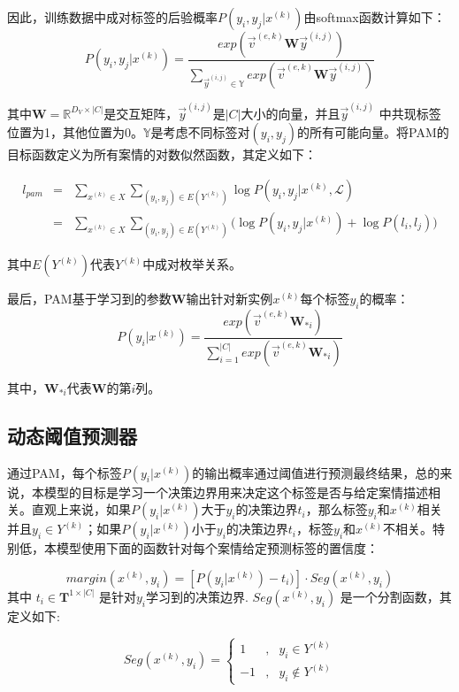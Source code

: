 因此，训练数据中成对标签的后验概率$P(y_i,y_j|x^{(k)})$由softmax函数计算如下：
\begin{displaymath}
P(y_i,y_j|x^{(k)})=\frac{exp(\vec{v}^{(e,k)}\textbf{W}\vec{y}^{(i,j)})}{\sum_{\vec{y}^{(i,j)}\in\mathbb{Y}}exp(\vec{v}^{(e,k)}\textbf{W}\vec{y}^{(i,j)})}
\end{displaymath}

其中$\textbf{W}=\mathbb{R}^{D_V\times |C|}$是交互矩阵，$\vec{y}^{(i,j)}$是$|C|$大小的向量，并且$\vec{y}^{(i,j)}$ 中共现标签位置为1，其他位置为0。$\mathbb{Y}$是考虑不同标签对$(y_i,y_j)$的所有可能向量。将PAM的目标函数定义为所有案情的对数似然函数，其定义如下：

\begin{eqnarray}\label{eq:pam}
l_{pam}&=&\sum_{x^{(k)}\in X}\sum_{(y_i,y_j)\in E(Y^{(k)})}\log P(y_i,y_j|x^{(k)},\mathcal{L})\\\nonumber
&=&\sum_{x^{(k)}\in X}\sum_{(y_i,y_j)\in E(Y^{(k)})}\Big(\log P(y_i,y_j|x^{(k)})+\log P(l_i,l_j)\Big)
\end{eqnarray}

其中$ E(Y^{(k)})$代表$Y^{(k)}$中成对枚举关系。

最后，PAM基于学习到的参数$\textbf{W}$输出针对新实例$x^{(k)}$每个标签$y_i$的概率：
$$
P(y_i|x^{(k)})=\frac{exp(\vec{v}^{(e,k)}\textbf{W}_{*i})}{\sum_{i=1}^{|C|}exp(\vec{v}^{(e,k)}\textbf{W}_{*i})}
$$

其中，$\textbf{W}_{*i}$代表$\textbf{W}$的第$i$列。

\subsection{动态阈值预测器}
通过PAM，每个标签$P(y_i|x^{(k)})$的输出概率通过阈值进行预测最终结果，总的来说，本模型的目标是学习一个决策边界用来决定这个标签是否与给定案情描述相关。直观上来说，如果$P(y_i|x^{(k)})$大于$y_i$的决策边界$t_i$，那么标签$y_i$和$x^{(k)}$相关并且$y_i\in Y^{(k)}$；如果$P(y_i|x^{(k)})$小于$y_i$的决策边界$t_i$，标签$y_i$和$x^{(k)}$不相关。特别低，本模型使用下面的函数针对每个案情给定预测标签的置信度：

\begin{equation}
margin(x^{(k)},y_i)=[P(y_i|x^{(k)})-t_i)]\cdot Seg(x^{(k)},y_i)
\end{equation}
其中 $t_i\in \textbf{T}^{1\times |C|}$ 是针对$y_i$学习到的决策边界. $Seg(x^{(k)},y_i)$ 是一个分割函数，其定义如下:


\begin{displaymath}
Seg(x^{(k)},y_i)=\left\{
\begin{aligned}
1 & , & y_i\in Y^{(k)} \\
-1 &, & y_i\notin Y^{(k)}
\end{aligned}
\right.
\end{displaymath}

